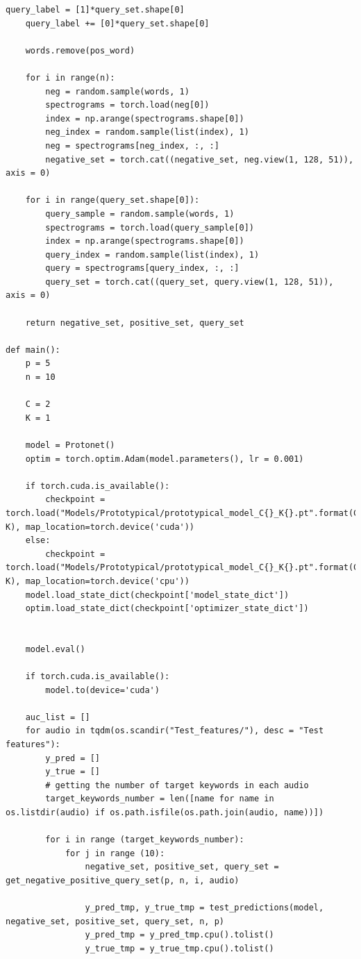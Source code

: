\documentclass[12pt,a4paper,titlepage]{article}
\begin{document}
\begin{lstlisting}[language=iPython,firstnumber=1, caption=protonet\_test.py, label=protonet test,captionpos=b]
    query_label = [1]*query_set.shape[0]
    query_label += [0]*query_set.shape[0]

    words.remove(pos_word)

    for i in range(n):
        neg = random.sample(words, 1)
        spectrograms = torch.load(neg[0])
        index = np.arange(spectrograms.shape[0])
        neg_index = random.sample(list(index), 1)
        neg = spectrograms[neg_index, :, :]
        negative_set = torch.cat((negative_set, neg.view(1, 128, 51)), axis = 0)

    for i in range(query_set.shape[0]):
        query_sample = random.sample(words, 1)
        spectrograms = torch.load(query_sample[0])
        index = np.arange(spectrograms.shape[0])
        query_index = random.sample(list(index), 1)
        query = spectrograms[query_index, :, :]
        query_set = torch.cat((query_set, query.view(1, 128, 51)), axis = 0)

    return negative_set, positive_set, query_set

def main():
    p = 5
    n = 10

    C = 2
    K = 1

    model = Protonet()
    optim = torch.optim.Adam(model.parameters(), lr = 0.001)

    if torch.cuda.is_available():
        checkpoint = torch.load("Models/Prototypical/prototypical_model_C{}_K{}.pt".format(C, K), map_location=torch.device('cuda'))
    else:
        checkpoint = torch.load("Models/Prototypical/prototypical_model_C{}_K{}.pt".format(C, K), map_location=torch.device('cpu'))
    model.load_state_dict(checkpoint['model_state_dict'])
    optim.load_state_dict(checkpoint['optimizer_state_dict'])


    model.eval()

    if torch.cuda.is_available():
        model.to(device='cuda')

    auc_list = []
    for audio in tqdm(os.scandir("Test_features/"), desc = "Test features"):
        y_pred = []
        y_true = []
        # getting the number of target keywords in each audio
        target_keywords_number = len([name for name in os.listdir(audio) if os.path.isfile(os.path.join(audio, name))])

        for i in range (target_keywords_number):
            for j in range (10):
                negative_set, positive_set, query_set = get_negative_positive_query_set(p, n, i, audio)  

                y_pred_tmp, y_true_tmp = test_predictions(model, negative_set, positive_set, query_set, n, p)
                y_pred_tmp = y_pred_tmp.cpu().tolist()
                y_true_tmp = y_true_tmp.cpu().tolist()
                

\end{lstlisting}
\end{document}
